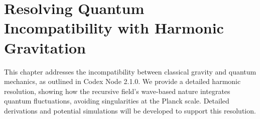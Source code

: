\section{Resolving Quantum Incompatibility with Harmonic Gravitation}
This chapter addresses the incompatibility between classical gravity and quantum mechanics, as outlined in Codex Node 2.1.0. We provide a detailed harmonic resolution, showing how the recursive field’s wave-based nature integrates quantum fluctuations, avoiding singularities at the Planck scale. Detailed derivations and potential simulations will be developed to support this resolution.